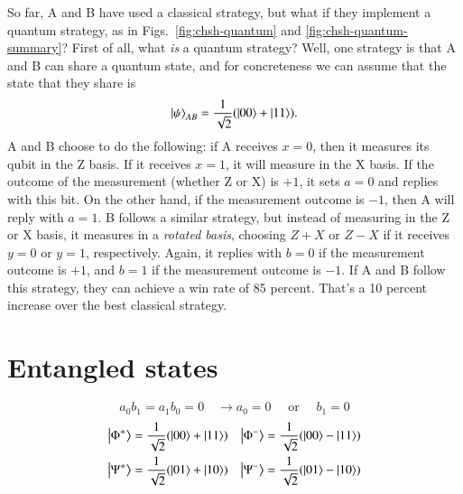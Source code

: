 So far, A and B have used a classical strategy, but what if they implement a quantum strategy, as in Figs.~\ref{fig:chsh-quantum} and \ref{fig:chsh-quantum-summary}? First of all, what \emph{is} a quantum strategy? Well, one strategy is that A and B can share a quantum state, and for concreteness we can assume that the state that they share is 
\begin{equation}
\left| \psi \right\rangle_{AB} = \frac{1}{\sqrt2}(\left| 00 \right\rangle + \left| 11 \right\rangle).
\end{equation}
A and B choose to do the following: if A receives $x=0$, then it measures its qubit in the Z basis. If it receives $x=1$, it will measure in the X basis. If the outcome of the measurement (whether Z or X) is $+1$, it sets $a=0$ and replies with this bit. On the other hand, if the measurement outcome is $-1$, then A will reply with $a=1$. B follows a similar strategy, but instead of measuring in the Z or X basis, it measures in a \emph{rotated basis}, choosing $Z+X$ or $Z-X$ if it receives $y=0$ or $y=1$, respectively. Again, it replies with $b=0$ if the measurement outcome is $+1$, and $b=1$ if the measurement outcome is $-1$. If A and B follow this strategy, they can achieve a win rate of 85 percent. That's a 10 percent increase over the best classical strategy.

\section{Entangled states}



\begin{equation}
a_{0} b_{1}=a_{1} b_{0}=0 \quad \longrightarrow a_{0}=0 \quad \text { or } \quad b_{1}=0
\end{equation}
\begin{equation}
\begin{aligned}
\left| \Phi^{+} \right\rangle&=\frac{1}{\sqrt{2}}(|00\rangle+|11\rangle) &\left|\Phi^{-}\right\rangle=\frac{1}{\sqrt{2}}(|00\rangle-|11\rangle) \\
\left| \Psi^{+} \right\rangle&=\frac{1}{\sqrt{2}}(|01\rangle+|10\rangle) &\left|\Psi^{-}\right\rangle=\frac{1}{\sqrt{2}}(|01\rangle-|10\rangle)
\end{aligned}
\end{equation}
\fi


